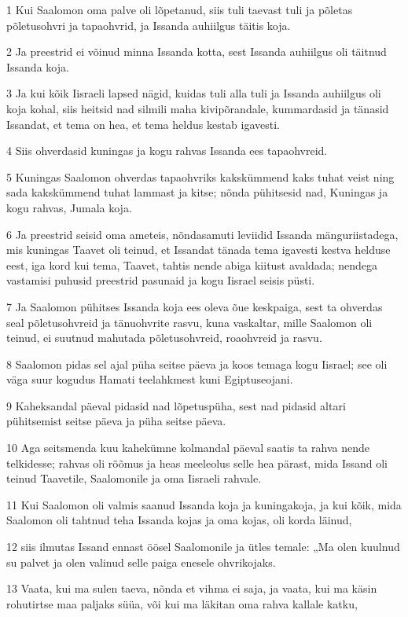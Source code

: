 \par 1 Kui Saalomon oma palve oli lõpetanud, siis tuli taevast tuli ja põletas põletusohvri ja tapaohvrid, ja Issanda auhiilgus täitis koja.
\par 2 Ja preestrid ei võinud minna Issanda kotta, sest Issanda auhiilgus oli täitnud Issanda koja.
\par 3 Ja kui kõik Iisraeli lapsed nägid, kuidas tuli alla tuli ja Issanda auhiilgus oli koja kohal, siis heitsid nad silmili maha kivipõrandale, kummardasid ja tänasid Issandat, et tema on hea, et tema heldus kestab igavesti.
\par 4 Siis ohverdasid kuningas ja kogu rahvas Issanda ees tapaohvreid.
\par 5 Kuningas Saalomon ohverdas tapaohvriks kakskümmend kaks tuhat veist ning sada kakskümmend tuhat lammast ja kitse; nõnda pühitsesid nad, Kuningas ja kogu rahvas, Jumala koja.
\par 6 Ja preestrid seisid oma ameteis, nõndasamuti leviidid Issanda mänguriistadega, mis kuningas Taavet oli teinud, et Issandat tänada tema igavesti kestva helduse eest, iga kord kui tema, Taavet, tahtis nende abiga kiitust avaldada; nendega vastamisi puhusid preestrid pasunaid ja kogu Iisrael seisis püsti.
\par 7 Ja Saalomon pühitses Issanda koja ees oleva õue keskpaiga, sest ta ohverdas seal põletusohvreid ja tänuohvrite rasvu, kuna vaskaltar, mille Saalomon oli teinud, ei suutnud mahutada põletusohvreid, roaohvreid ja rasvu.
\par 8 Saalomon pidas sel ajal püha seitse päeva ja koos temaga kogu Iisrael; see oli väga suur kogudus Hamati teelahkmest kuni Egiptuseojani.
\par 9 Kaheksandal päeval pidasid nad lõpetuspüha, sest nad pidasid altari pühitsemist seitse päeva ja püha seitse päeva.
\par 10 Aga seitsmenda kuu kahekümne kolmandal päeval saatis ta rahva nende telkidesse; rahvas oli rõõmus ja heas meeleolus selle hea pärast, mida Issand oli teinud Taavetile, Saalomonile ja oma Iisraeli rahvale.
\par 11 Kui Saalomon oli valmis saanud Issanda koja ja kuningakoja, ja kui kõik, mida Saalomon oli tahtnud teha Issanda kojas ja oma kojas, oli korda läinud,
\par 12 siis ilmutas Issand ennast öösel Saalomonile ja ütles temale: „Ma olen kuulnud su palvet ja olen valinud selle paiga enesele ohvrikojaks.
\par 13 Vaata, kui ma sulen taeva, nõnda et vihma ei saja, ja vaata, kui ma käsin rohutirtse maa paljaks süüa, või kui ma läkitan oma rahva kallale katku,
